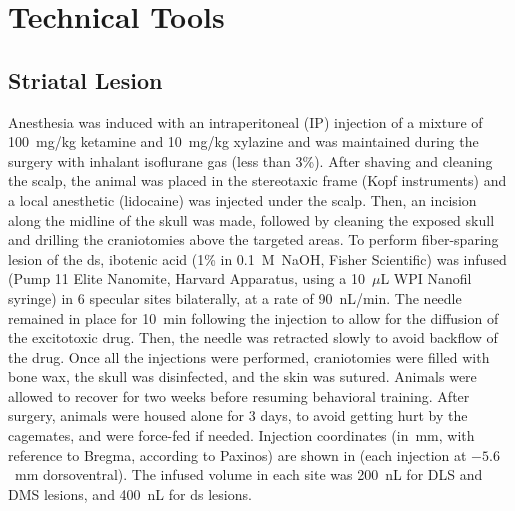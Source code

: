 \section{Technical Tools} \label{ch:methods:tech}

\subsection{Striatal Lesion} \label{ch:method:lesion}

Anesthesia was induced with an intraperitoneal (IP) injection of a mixture of 100~mg/kg ketamine and 10~mg/kg xylazine and was maintained during the surgery with inhalant isoflurane gas (less than 3\%).
After shaving and cleaning the scalp, the animal was placed in the stereotaxic frame (Kopf instruments) and a local anesthetic (lidocaine) was injected under the scalp.
Then, an incision along the midline of the skull was made, followed by cleaning the exposed skull and drilling the craniotomies above the targeted areas.
To perform fiber-sparing lesion of the \gls{ds}, ibotenic acid (1\% in 0.1~M~NaOH, Fisher Scientific) was infused (Pump 11 Elite Nanomite, Harvard Apparatus, using a 10~$\mu$L WPI Nanofil syringe) in 6 specular sites bilaterally, at a rate of 90~nL/min.
The needle remained in place for 10~min following the injection to allow for the diffusion of the excitotoxic drug.
Then, the needle was retracted slowly to avoid backflow of the drug.
Once all the injections were performed, craniotomies were filled with bone wax, the skull was disinfected, and the skin was sutured.
Animals were allowed to recover for two weeks before resuming behavioral training.
After surgery, animals were housed alone for 3 days, to avoid getting hurt by the cagemates, and were force-fed if needed.
Injection coordinates (in~mm, with reference to Bregma, according to Paxinos) are shown in  (each injection at $-5.6$~mm dorsoventral).
The infused volume in each site was 200~nL for DLS and DMS lesions, and 400~nL for \gls{ds} lesions.


